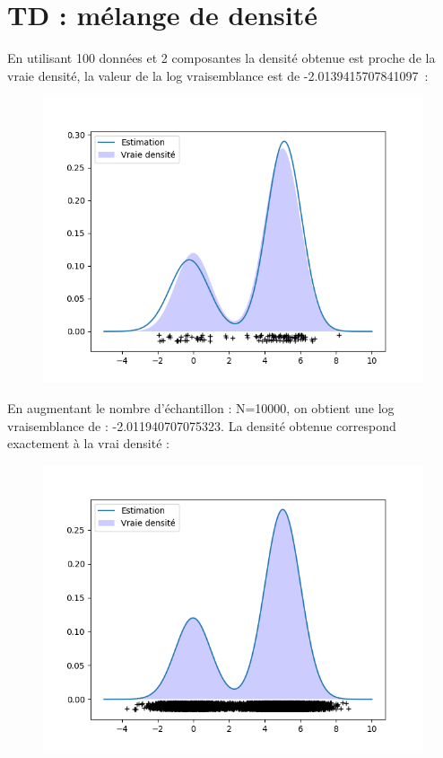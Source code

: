 \documentclass[12pt]{scrartcl} %
\begin{document}
\section{TD : mélange de densité}
En utilisant 100 données et 2 composantes la densité obtenue est proche de la vraie densité, la valeur de la log vraisemblance est de -2.0139415707841097~:
\newline
\begin{figure}[!h]
 \centering 
\includegraphics[scale=.3]{densite100.png}
\end{figure}
\newline 
En augmentant le nombre d'échantillon : N=10000, on obtient une log vraisemblance de : -2.011940707075323. La densité obtenue correspond exactement à la vrai densité : 
\newline
\begin{figure}[!h]
 \centering 
\includegraphics[scale=.3]{densite10000.png}
\end{figure}
\end{document}
